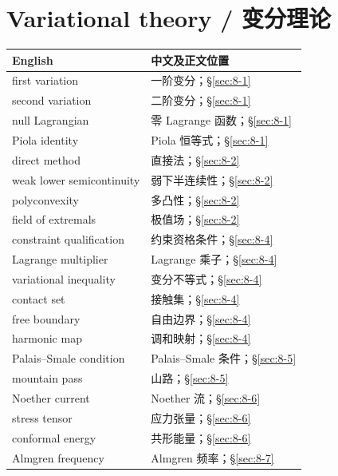 \section*{Variational theory / 变分理论}
\begin{center}\small
\begin{tabular}{@{}p{.53\linewidth}p{.38\linewidth}@{}}
\textbf{English}&\textbf{中文及正文位置}\\\hline
first variation & 一阶变分；\S\ref{sec:8-1}\\
second variation & 二阶变分；\S\ref{sec:8-1}\\
null Lagrangian & 零 Lagrange 函数；\S\ref{sec:8-1}\\
Piola identity & Piola 恒等式；\S\ref{sec:8-1}\\
direct method & 直接法；\S\ref{sec:8-2}\\
weak lower semicontinuity & 弱下半连续性；\S\ref{sec:8-2}\\
polyconvexity & 多凸性；\S\ref{sec:8-2}\\
field of extremals & 极值场；\S\ref{sec:8-2}\\
constraint qualification & 约束资格条件；\S\ref{sec:8-4}\\
Lagrange multiplier & Lagrange 乘子；\S\ref{sec:8-4}\\
variational inequality & 变分不等式；\S\ref{sec:8-4}\\
contact set & 接触集；\S\ref{sec:8-4}\\
free boundary & 自由边界；\S\ref{sec:8-4}\\
harmonic map & 调和映射；\S\ref{sec:8-4}\\
Palais--Smale condition & Palais--Smale 条件；\S\ref{sec:8-5}\\
mountain pass & 山路；\S\ref{sec:8-5}\\
Noether current & Noether 流；\S\ref{sec:8-6}\\
stress tensor & 应力张量；\S\ref{sec:8-6}\\
conformal energy & 共形能量；\S\ref{sec:8-6}\\
Almgren frequency & Almgren 频率；\S\ref{sec:8-7}
\end{tabular}
\end{center}
\clearpage
